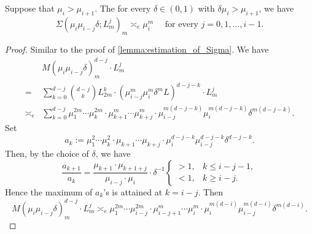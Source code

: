\begin{lemma}\label{lem:growth_of_sigma_L_m}
	Suppose that $\mu_i > \mu_{i+1}$.
	The for every $\delta \in (0, 1)$ with $\delta \mu_i > \mu_{i+1}$, we have
	\[ \Sigma(\mu_i \mu_{i-j} \delta; L_m^j)_m \asymp_e \mu_i^m \quad \text{ for every } j = 0, 1, \ldots, i-1. \]
\end{lemma}
\begin{proof}
	Similar to the proof of \cref{lemma:estimation_of_Sigma}.
	We have
	\begin{align*}
		         & M(\mu_i \mu_{i-j} \delta)_m^{d-j} \cdot L_m^{j}                                                                                                   \\
		=        & \sum_{k=0}^{d-j} \binom{d-j}{k} L_{2m}^{k} \cdot (\mu_{i-j}^m \mu_i^m \delta^m L)^{d-j-k} \cdot L_m^{j}                                           \\
		\asymp_e & \sum_{k=0}^{d-j} \mu_1^{2m} \cdots \mu_k^{2m} \cdot \mu_{k+1}^m \cdots \mu_{k+j}^m \cdot \mu_{i-j}^{m(d-j-k)} \mu_i^{m(d-j-k)} \delta^{m(d-j-k)}.
	\end{align*}
	Set
	\[ a_k := \mu_1^2 \cdots \mu_k^2 \cdot \mu_{k+1} \cdots \mu_{k+j} \cdot \mu_i^{d-j-k} \mu_{i-j}^{d-j-k} \delta^{d-j-k}. \]
	Then, by the choice of $\delta$, we have
	\begin{equation}\label{eq:ratio_of_a_k_in_estimation_of_Sigma_and_setting_of_delta}
		\frac{a_{k+1}}{a_k} = \frac{\mu_{k+1} \cdot \mu_{k+1+j}}{\mu_{i-j} \cdot \mu_i} \cdot \delta^{-1} \begin{cases}
			> 1, & k \leq i-j-1, \\
			< 1, & k \geq i-j .
		\end{cases}
	\end{equation}
	Hence the maximum of $a_k$'s is attained at $k = i-j$.
	Then
	\begin{equation}\label{eq:estimation_of_numerator_in_Sigma_L_m_in_lemma}
		M(\mu_i \mu_{i-j} \delta)_m^{d-j} \cdot L_m^{j} \asymp_e \mu_1^{2m} \cdots \mu_{i-j}^{2m} \cdot \mu_{i-j+1}^m \cdots \mu_{i}^m \cdot \mu_i^{m(d-i)} \mu_{i-j}^{m(d-i)} \delta^{m(d-i)}.
	\end{equation}


\end{proof}
